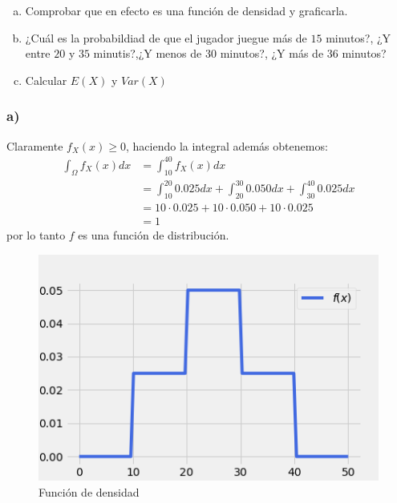 \documentclass{article}
\begin{document}
\begin{enumerate}[a)]
    \item Comprobar que en efecto es una función de densidad y graficarla.
    \item ¿Cuál es la probabildiad de que el jugador juegue más de $15$ minutos?, ¿Y entre $20$ y $35$ minutis?,¿Y menos de $30$ minutos?,
    ¿Y más de $36$ minutos?
    \item Calcular $E(X)$ y $Var(X)$
\end{enumerate}
\begin{tcolorbox}[breakable]
    \subsubsection*{a)}
    Claramente $f_X(x)\geq 0$, haciendo la integral además obtenemos:
    \begin{align*}
        \int_\Omega f_X(x)dx 
        &= \int_{10}^{40} f_X(x)dx \\
        &= \int_{10}^{20} 0.025dx + \int_{20}^{30} 0.050dx + \int_{30}^{40} 0.025dx \\
        &= 10 \cdot 0.025 + 10 \cdot 0.050 + 10 \cdot 0.025 \\
        &= 1
    \end{align*}
    por lo tanto $f$ es una función de distribución.
    \begin{figure}[H]
        \centering
        \includegraphics[scale=0.7]{images/p4_density.png}
        \caption{Función de densidad}
    \end{figure}

\end{tcolorbox}
\end{document}
